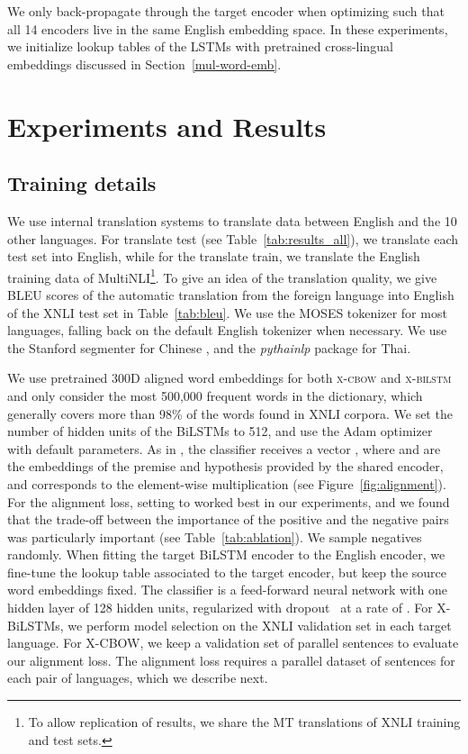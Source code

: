 \documentclass[11pt,a4paper]{article}
\begin{document}
We only back-propagate through the target encoder when optimizing  such that all 14 encoders live in the same English embedding space. In these experiments, we initialize lookup tables of the LSTMs with pretrained cross-lingual embeddings discussed in Section~\ref{mul-word-emb}.




\section{Experiments and Results}
\label{SectExps}

\insertXNLIresults


\subsection{Training details}
We use internal translation systems to translate data between English and the 10 other languages. For {\sc translate test} (see Table~\ref{tab:results_all}), we translate each test set into English, while for the {\sc translate train}, we translate the English training data of MultiNLI\footnote{To allow replication of results, we share the MT translations of XNLI training and test sets.}.
To give an idea of the translation quality, we give BLEU scores of the automatic translation from the foreign language into English of the XNLI test set in Table~\ref{tab:bleu}. We use the MOSES tokenizer for most languages, falling back on the default English tokenizer when necessary. We use the Stanford segmenter for Chinese \cite{chang2008optimizing}, and the \textit{pythainlp} package for Thai. 


We use pretrained 300D aligned word embeddings for both \textsc{x-cbow} and \textsc{x-bilstm} and only consider the most 500,000 frequent words in the dictionary, which generally covers more than 98\% of the words found in XNLI corpora.  We set the number of hidden units of the BiLSTMs to 512, and use the Adam optimizer \cite{kingma2014adam} with default parameters. As in \cite{conneau2017supervised}, the classifier receives a vector , where  and  are the embeddings of the premise and hypothesis provided by the shared encoder, and  corresponds to the element-wise multiplication (see Figure~\ref{fig:alignment}). For the alignment loss, setting  to  worked best in our experiments, and we found that the trade-off between the importance of the positive and the negative pairs was particularly important (see Table~\ref{tab:ablation}). We sample negatives randomly. When fitting the target BiLSTM encoder to the English encoder, we fine-tune the lookup table associated to the target encoder, but keep the source word embeddings fixed. The classifier is a feed-forward neural network with one hidden layer of 128 hidden units, regularized with dropout~\cite{srivastava2014dropout} at a rate of . For X-BiLSTMs, we perform model selection on the XNLI validation set in each target language. For X-CBOW, we keep a validation set of parallel sentences to evaluate our alignment loss. The alignment loss requires a parallel dataset of sentences for each pair of languages, which we describe next.
\end{document}
